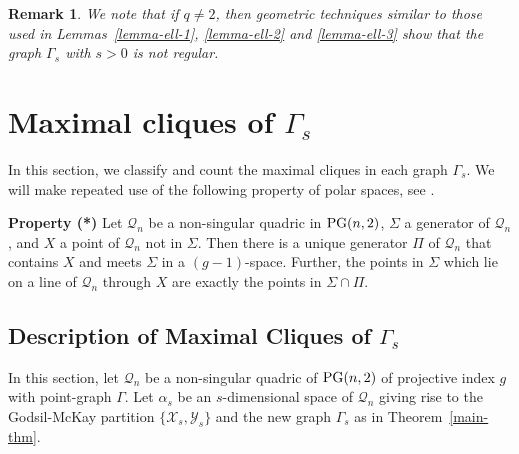 \documentclass[12pt]{article}
\newtheorem{remark}[theorem]{Remark}
\newcommand{\X}{\mathcal X}
\newcommand{\Y}{\mathcal Y}
\newcommand{\Q}{\mathscr Q}
\newcommand\PG{{\rm PG}}
\newcommand{\Label}{\label}
\begin{document}
\begin{remark}{\rm  We note that if $q\neq 2$, then geometric techniques similar to those used in Lemmas~\ref{lemma-ell-1}, 
\ref{lemma-ell-2} and \ref{lemma-ell-3} show that the graph $\Gamma_s$ with $s>0$ is {\em not} regular. }
\end{remark}

\section{Maximal cliques of $\Gamma_s$}\Label{sec-cliques}

In this section, we classify and count the maximal cliques in each  graph $\Gamma_s$. We will  make repeated use of the following property of polar spaces, see \cite[Section 26.1]{HT}.

 {\bf Property (*)} Let $\Q_n$ be a non-singular quadric in $\PG(n,2)$, $\Sigma$   a generator of $\Q_n$, and $X$ a point of $\Q_n$ not in $\Sigma$. Then there is a unique generator $\Pi$ of $\Q_n$ that contains $X$ and meets $\Sigma$ in a $(g-1)$-space.  Further, the  points in $\Sigma$ which lie on a line of $\Q_n$ through  $X$ are exactly the points in $\Sigma\cap\Pi$.


\subsection{Description of Maximal Cliques of $\Gamma_s$}\Label{sec:max-descr}



In this section, let $\Q_n$ be a non-singular quadric of $\PG(n,2)$ of projective index $g$ with point-graph $\Gamma$. Let $\alpha_s$ be an $s$-dimensional space of $\Q_n$ giving rise to the Godsil-McKay partition  $\{\X_s,\Y_s\}$ and the new graph $\Gamma_s$ as in Theorem~\ref{main-thm}.
\end{document}
